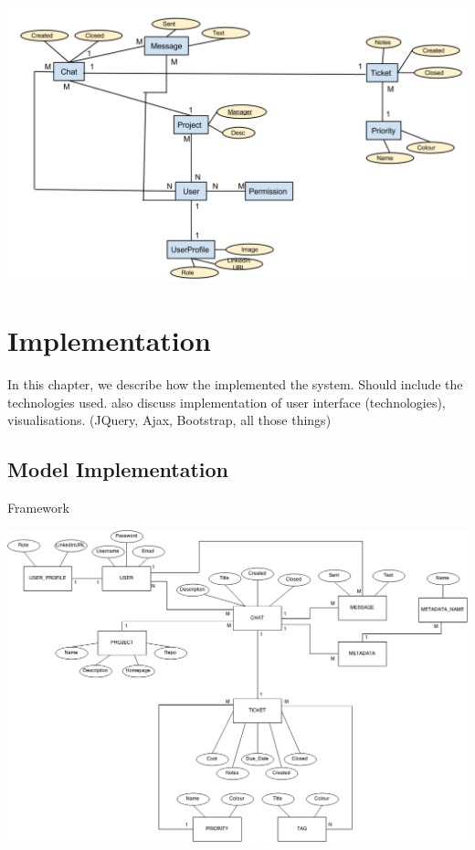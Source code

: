 \documentclass[a4paper]{l3proj}
\begin{document}
\includegraphics[scale=0.4]{ER_Diagram}

\chapter{Implementation}
\label{impl}

In this chapter, we describe how the implemented the system. Should include the technologies used.  also discuss implementation of user interface (technologies), visualisations.
(JQuery, Ajax, Bootstrap, all those things)

\section{Model Implementation}

Framework

\includegraphics[scale=0.4]{newERdiagram}
\end{document}
